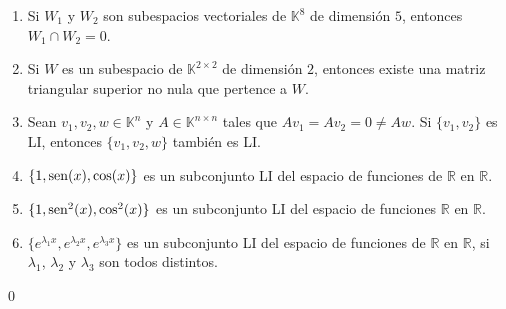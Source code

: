 \begin{enumerate}[resume, topsep=6pt, itemsep=.4cm]
    \begin{enumerate}
    \item Si $W_1$ y $W_2$ son subespacios vectoriales de $\mathbb{K}^8$ de dimensión $5$, entonces $W_1\cap W_2=0$.
    \item Si $W$ es un subespacio de $\mathbb{K}^{2\times2}$ de dimensión $2$, entonces existe una matriz triangular superior no nula que pertence a $W$.
    \item Sean $v_1, v_2, w\in \mathbb{K}^{n}$ y $A\in\mathbb{K}^{n\times n}$ tales que $Av_1=Av_2=0\neq Aw$. Si $\{v_1, v_2\}$ es LI, entonces $\{v_1,v_2,w\}$ también es LI.
    \item\label{cos}  $\{1,{\rm sen}(x),\cos(x)\}$ es un subconjunto LI del espacio de funciones de $\mathbb{R}$ en $\mathbb{R}$.
    \item\label{cos2}  $\{1,{\rm sen}^2(x),\cos^2(x)\}$ es un subconjunto LI del espacio de funciones $\mathbb{R}$ en $\mathbb{R}$.
    \item\label{exponencial}  $\{e^{\lambda_1x},e^{\lambda_2x},e^{\lambda_3x}\}$ es un subconjunto LI del espacio de funciones de
    $\mathbb{R}$ en $\mathbb{R}$, si $\lambda_1$, $\lambda_2$ y $\lambda_3$ son todos distintos.
    \end{enumerate}
    
    
    \rta 

    \qed     
    
    
    
    
    \end{enumerate}
    
    